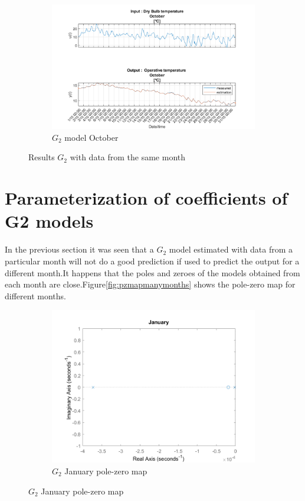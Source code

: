 \documentclass[a4paper,12pt]{report}
\numberwithin{equation}{section}
\begin{document}
\begin{figure}[H]\ContinuedFloat
\begin{subfigure}{\textwidth}
  \centering
  \includegraphics[width=.8\linewidth]{G2_Oct.png}
  \caption{$G_{2}$ model October}
  \label{fig:G2 october}
\end{subfigure}
\caption{Results $G_{2}$ with data from the same month}
\label{fig:G2othermonth}
\end{figure}

\section{Parameterization of coefficients of G2 models}
In the previous section it was seen that a $G_{2}$ model estimated with data from a particular month will not do a good prediction if used to predict the output for a different month.It happens that the poles and zeroes of the models obtained from each month are close.Figure\ref{fig:pzmapmanymonths} shows the pole-zero map for different months.

\begin{figure}[H]
\centering
\begin{subfigure}{\textwidth}
  \centering
  \includegraphics[width=.7\linewidth]{G2_jan_pzmap.png}
  \caption{$G_{2}$ January pole-zero map}
  \label{fig:G2_jan_pzmap}
\end{subfigure}
\end{figure}
\end{document}
